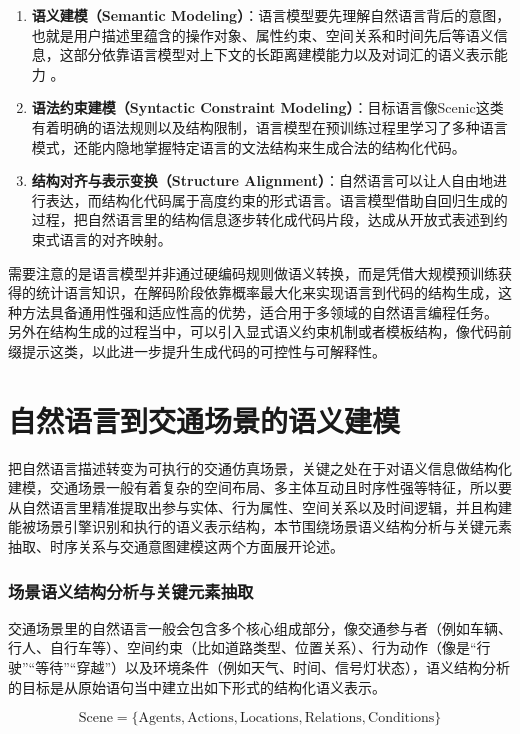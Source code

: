 \begin{enumerate}
	\item \textbf{语义建模（Semantic Modeling）}：语言模型要先理解自然语言背后的意图，也就是用户描述里蕴含的操作对象、属性约束、空间关系和时间先后等语义信息，这部分依靠语言模型对上下文的长距离建模能力以及对词汇的语义表示能力 。
	
	\item \textbf{语法约束建模（Syntactic Constraint Modeling）}：目标语言像Scenic这类有着明确的语法规则以及结构限制，语言模型在预训练过程里学习了多种语言模式，还能内隐地掌握特定语言的文法结构来生成合法的结构化代码。
	
	\item \textbf{结构对齐与表示变换（Structure Alignment）}：自然语言可以让人自由地进行表达，而结构化代码属于高度约束的形式语言。语言模型借助自回归生成的过程，把自然语言里的结构信息逐步转化成代码片段，达成从开放式表述到约束式语言的对齐映射。
\end{enumerate}

需要注意的是语言模型并非通过硬编码规则做语义转换，而是凭借大规模预训练获得的统计语言知识，在解码阶段依靠概率最大化来实现语言到代码的结构生成，这种方法具备通用性强和适应性高的优势，适合用于多领域的自然语言编程任务。
另外在结构生成的过程当中，可以引入显式语义约束机制或者模板结构，像代码前缀提示这类，以此进一步提升生成代码的可控性与可解释性。
\section{自然语言到交通场景的语义建模}

把自然语言描述转变为可执行的交通仿真场景，关键之处在于对语义信息做结构化建模，交通场景一般有着复杂的空间布局、多主体互动且时序性强等特征，所以要从自然语言里精准提取出参与实体、行为属性、空间关系以及时间逻辑，并且构建能被场景引擎识别和执行的语义表示结构，本节围绕场景语义结构分析与关键元素抽取、时序关系与交通意图建模这两个方面展开论述。

\subsubsection{场景语义结构分析与关键元素抽取}

交通场景里的自然语言一般会包含多个核心组成部分，像交通参与者（例如车辆、行人、自行车等）、空间约束（比如道路类型、位置关系）、行为动作（像是“行驶”“等待”“穿越”）以及环境条件（例如天气、时间、信号灯状态），语义结构分析的目标是从原始语句当中建立出如下形式的结构化语义表示。

\begin{equation}
	\text{Scene} = \{ \text{Agents}, \text{Actions}, \text{Locations}, \text{Relations}, \text{Conditions} \}
\end{equation}

